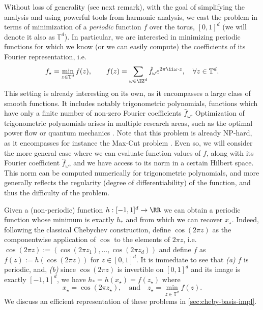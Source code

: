 \documentclass{article}
\begin{document}
Without loss of generality (see next remark), with the goal of simplifying the analysis and using powerful tools from harmonic analysis, we cast the problem in terms of minimization of a {\em periodic} function $f$ over the torus, $[0,1]^d$ (we will denote it also as $\mathbb{T}^d$). In particular, we are interested in minimizing periodic functions for which we know (or we can easily compute) the coefficients of its Fourier representation, i.e.
\begin{equation}\label{eq:min-probl-main}
  f_\star = \min_{z \in \mathbb{T}^d} f(z), \qquad f(z) = \sum_{\omega \in \ZZ^d} \hat{f}_\omega e^{2\pi \ii \omega \cdot z}, \quad \forall z \in \mathbb{T}^d.
\end{equation}
This setting is already interesting on its own, as it encompasses a large class of smooth functions. It includes notably trigonometric polynomials, \ie functions which have only a finite number of non-zero Fourier coefficients $\hat{f}_\omega$. Optimization of trigonometric polynomials arises in multiple research areas, such as the optimal power flow \cite{vanhentenryckMachineLearningOptimal18} or quantum mechanics \cite{hillingGeometricMeasureMultipartite2010}. Note that this problem is already NP-hard, as it encompasses for instance the Max-Cut problem \cite{waldspurgerPhaseRecoveryMaxCut2013}. Even so, we will consider the more general case where we can evaluate function values of $f$, along with its Fourier coefficient $\hat{f}_\omega$, and we have access to its norm in a certain Hilbert space. This norm can be computed numerically for trigonometric polynomials, and more generally reflects the regularity (degree of differentiability) of the function, and thus the difficulty of the problem.

\begin{remark}
  Given a (non-periodic) function $h: [-1,1]^d \to \RR$ we can obtain a periodic function whose minimum is exactly $h_*$ and from which we can recover $x_\star$. Indeed, following the classical Chebychev construction, define $\cos(2\pi z)$ as the componentwise application of $\cos$ to the elements of $2\pi z$, i.e. $\cos(2\pi z) := (\cos(2\pi z_1), \dots, \cos(2\pi z_d))$ and
  define $f$ as $f(z) := h(\cos(2\pi z))$ for $z \in [0,1]^d$. It is immediate to see that \emph{(a)} $f$ is periodic, and, \emph{(b)} since $\cos(2\pi z)$ is invertible on $[0,1]^d$ and its image is exactly $[-1,1]^d$, we have $h_* = h(x_\star) = f(z_\star)$ where
  \begin{equation*}
    x_\star = \cos(2 \pi z_\star), \quad \textrm{and} \quad z_\star = \min_{z \in \mathbb{T}^d} f(z).
  \end{equation*}
  We discuss an efficient representation of these problems in \cref{sec:cheby-basis-impl}.
\end{remark}
\end{document}
